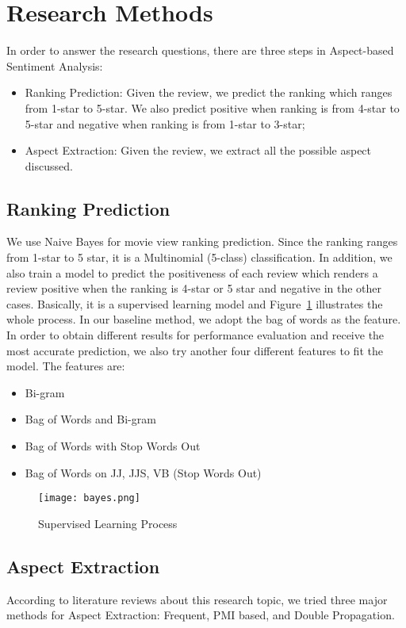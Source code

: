 \documentclass[12pt]{article}
\begin{document}
\section{Research Methods}
In order to answer the research questions, there are three steps in Aspect-based Sentiment Analysis: 
\begin{itemize}
\item Ranking Prediction: Given the review, we predict the ranking which ranges from 1-star to 5-star. We also predict positive when ranking is from 4-star to 5-star and negative when ranking is from 1-star to 3-star;
\item Aspect Extraction: Given the review, we extract all the possible aspect discussed.
\end{itemize}

\subsection{Ranking Prediction}
We use Naive Bayes for movie view ranking prediction. Since the ranking ranges from 1-star to 5 star, it is a Multinomial (5-class) classification. In addition, we also train a model to predict the positiveness of each review which renders a review positive when the ranking is 4-star or 5 star and negative in the other cases. Basically, it is a supervised learning model and Figure~\ref{bayes} illustrates the whole process.  In our baseline method, we adopt the bag of words as the feature. In order to obtain different results for performance evaluation and receive the most accurate prediction, we also try another four different features to fit the model. The features are:
\begin{itemize}
\item Bi-gram
\item Bag of Words and Bi-gram
\item Bag of Words with Stop Words Out
\item Bag of Words on JJ, JJS, VB (Stop Words Out)
\end{itemize}

\begin{figure}[!tp]
\centering
\texttt{[image: bayes.png]}
\caption{Supervised Learning Process}
\label{bayes}
\end{figure}


\subsection{Aspect Extraction}
According to literature reviews about this research topic, we tried three major methods for Aspect Extraction: Frequent, PMI based, and Double Propagation. 
	
\end{document}
